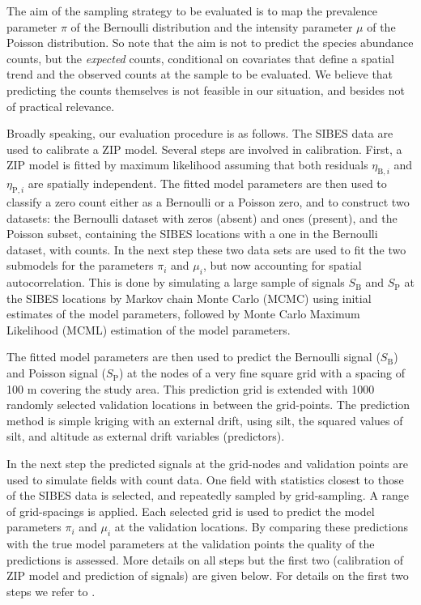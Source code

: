 \documentclass[review]{elsarticle}
\begin{document}
The aim of the sampling strategy to be evaluated is to map the prevalence parameter $\pi$ of the Bernoulli distribution and the intensity parameter $\mu$ of the Poisson distribution. So note that the aim is not to predict the species abundance counts, but the \emph{expected} counts, conditional on covariates that define a spatial trend and the observed counts at the sample to be evaluated. We believe that predicting the counts themselves is not feasible in our situation, and besides not of practical relevance. 

Broadly speaking, our evaluation procedure is as follows. The SIBES data are used to calibrate a ZIP model. Several steps are involved in calibration. First, a ZIP model is fitted by maximum likelihood assuming that both residuals $\eta_{\mathrm{B},i}$ and $\eta_{\mathrm{P},i}$ are spatially independent. The fitted model parameters are then used to classify a zero count either as a Bernoulli or a Poisson zero, and to construct two datasets: the Bernoulli dataset with zeros (absent) and ones (present), and the Poisson subset, containing the SIBES locations with a one in the Bernoulli dataset, with counts. In the next step these two data sets are used to fit the two submodels for the parameters $\pi_i$ and $\mu_i$, but now accounting for spatial autocorrelation. This is done by simulating a large sample of signals $S_{\mathrm{B}}$ and $S_{\mathrm{P}}$ at the SIBES locations by Markov chain Monte Carlo (MCMC) using initial estimates of the model parameters, followed by Monte Carlo Maximum Likelihood (MCML) estimation of the model parameters.

The fitted model parameters are then used to predict the Bernoulli signal ($S_{\mathrm{B}}$) and Poisson signal ($S_{\mathrm{P}}$) at the nodes of a very fine square grid with a spacing of 100 m covering the study area. This prediction grid is extended with 1000 randomly selected validation locations in between the grid-points. The prediction method is simple kriging with an external drift, using silt, the squared values of silt, and altitude as external drift variables (predictors).

In the next step the predicted signals at the grid-nodes and validation points are used to simulate fields with count data. One field with statistics closest to those of the SIBES data is selected, and repeatedly sampled by grid-sampling. A range of grid-spacings is applied. Each selected grid is used to predict the model parameters $\pi_i$ and $\mu_i$ at the validation locations. By comparing these predictions with the true model parameters at the validation points the quality of the predictions is assessed. More details on all steps but the first two (calibration of ZIP model and prediction of signals) are given below. For details on the first two steps we refer to \citet{lyashevska2015a}.
\end{document}
